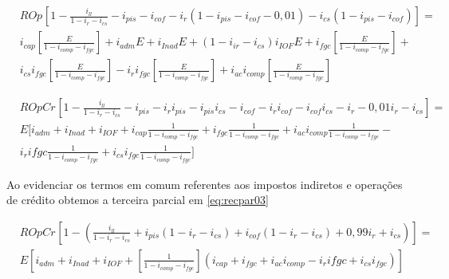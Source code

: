 \documentclass[
  12pt,
  12pt,
  openright,
  oneside,
  a4paper,
  chapter=TITLE,
  section=TITLE,
  subsection=TITLE,
  subsubsection=TITLE,
  portugues,
  sumario=tradicional]{abntex2}
\begin{document}
\begin{apendicesenv}
\begin{equation}\label{eq:decrec2}
\begin{aligned}
& ROp_{} \left[ 1 - \frac{i_{ll}}{1 - i_{r} - i_{cs}} - i_{pis} - i_{cof} - i_{r} (1-i_{pis} - i_{cof} - 0,01) - i_{cs} (1-i_{pis} - i_{cof}) \right] = \\
& i_{cap} \left[ \frac{E}{1 - i_{comp} - i_{fgc}} \right] + i_{adm}E + i_{Inad}E + (1 - i_{ir} - i_{cs})i_{IOF}E + i_{fgc} \left[ \frac{E}{1 - i_{comp} - i_{fgc}} \right] + \\ & i_{cs}i_{fgc}\left[\frac{E}{1 - i_{comp} - i_{fgc}}\right] - 
i_{r}i_{fgc}\left[\frac{E}{1 - i_{comp} - i_{fgc}}\right] + i_{ac}i_{comp}\left[\frac{E}{1 - i_{comp} - i_{fgc}}\right]
\end{aligned}
\end{equation}




\begin{equation}\label{eq:recpar02}
\begin{aligned}
& ROpCr_{}\left[ 1 - \frac{i_{ll}}{1 - i_{r} - i_{cs}} - i_{pis} - i_{r}i_{pis} - i_{pis}i_{cs} - i_{cof} - i_{r}i_{cof} - i_{cof}i_{cs} - i_{r} - 0,01i_{r} - i_{cs}\right] = \\
& E [ i_{adm} + i_{Inad} + i_{IOF} +  i_{cap}\frac{1}{1 - i_{comp} - i_{fgc}} + i_{fgc}\frac{1}{1 - i_{comp} - i_{fgc}} + i_{ac}i_{comp}\frac{1}{1 - i_{comp} - i_{fgc}} - \\
& i_{r}i{fgc}\frac{1}{1 - i_{comp} - i_{fgc}} + i_{cs}i_{fgc}\frac{1}{1 - i_{comp} - i_{fgc}} ]
\end{aligned}
\end{equation}


Ao evidenciar os termos em comum referentes aos impostos indiretos e operações de crédito obtemos a terceira parcial em \autoref{eq:recpar03}



\begin{equation}\label{eq:recpar03}
\begin{aligned}
& ROpCr_{}\left[1 - (\frac{i_{ll}}{1 - i_{r} - i_{cs}} + i_{pis}(1 - i_{r} - i_{cs}) + i_{cof}(1 - i_{r} - i_{cs}) + 0,99i_{r} + i_{cs})\right] = \\
& E\left[i_{adm} + i_{Inad} + i_{IOF} +  [\frac{1}{1 - i_{comp} - i_{fgc}}] (i_{cap} + i_{fgc} + i_{ac}i_{comp} - i_{r}i{fgc}+ i_{cs}i_{fgc})\right]
\end{aligned}
\end{equation}




\end{apendicesenv}
\end{document}
